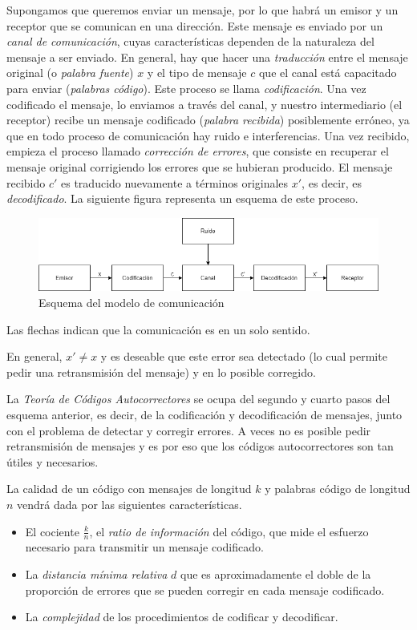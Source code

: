 Supongamos que queremos enviar un mensaje, por lo que habrá un emisor y un receptor que se comunican en una dirección. Este mensaje es enviado por un \emph{canal de comunicación}, cuyas características dependen de la naturaleza del mensaje a ser enviado. En general, hay que hacer una \emph{traducción} entre el mensaje original (o \emph{palabra fuente}) $x$ y el tipo de mensaje $c$ que el canal está capacitado para enviar (\emph{palabras código}). Este proceso se llama \emph{codificación}. Una vez codificado el mensaje, lo enviamos a través del canal, y nuestro intermediario (el receptor) recibe un mensaje codificado (\emph{palabra recibida}) posiblemente erróneo, ya que en todo proceso de comunicación hay ruido e interferencias. Una vez recibido, empieza el proceso llamado \emph{corrección de errores}, que consiste en recuperar el mensaje original corrigiendo los errores que se hubieran producido. El mensaje recibido $c'$ es traducido nuevamente a términos originales $x'$, es decir, es \emph{decodificado}. La siguiente figura representa un esquema de este proceso.

\begin{figure}[H]
	\center
	\includegraphics[scale=0.5]{figures/Diagrama_comunicacion.png}
	\caption{Esquema del modelo de comunicación}
\end{figure}

Las flechas indican que la comunicación es en un solo sentido.

En general, $x' \neq x$ y es deseable que este error sea detectado (lo cual permite pedir una retransmisión del mensaje) y en lo posible corregido.

La \emph{Teoría de Códigos Autocorrectores} se ocupa del segundo y cuarto pasos del esquema anterior, es decir, de la codificación y decodificación de mensajes, junto con el problema de detectar y corregir errores. A veces no es posible pedir retransmisión de mensajes y es por eso que los códigos autocorrectores son tan útiles y necesarios.

La calidad de un código con mensajes de longitud $k$ y palabras código de longitud $n$ vendrá dada por las siguientes características.

\begin{itemize}
    \item El cociente $\frac{k}{n}$, el \emph{ratio de información} del código, que mide el esfuerzo necesario para transmitir un mensaje codificado.
    \item La \emph{distancia mínima relativa} $d$ que es aproximadamente el doble de la proporción de errores que se pueden corregir en cada mensaje codificado.
    \item La \emph{complejidad} de los procedimientos de codificar y decodificar.
\end{itemize}

